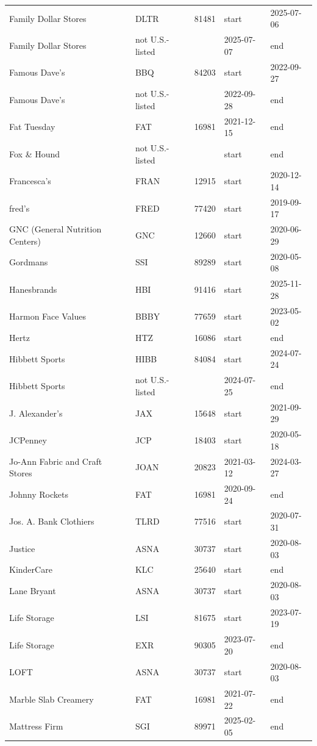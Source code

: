 \begin{longtable}{>{\raggedright\arraybackslash}p{5.2cm}lrll}
Family Dollar Stores & DLTR & 81481 & start & 2025-07-06 \\
Family Dollar Stores & not U.S.-listed &  & 2025-07-07 & end \\
Famous Dave's & BBQ & 84203 & start & 2022-09-27 \\
Famous Dave's & not U.S.-listed &  & 2022-09-28 & end \\
Fat Tuesday & FAT & 16981 & 2021-12-15 & end \\
Fox \& Hound & not U.S.-listed &  & start & end \\
Francesca's & FRAN & 12915 & start & 2020-12-14 \\
fred's & FRED & 77420 & start & 2019-09-17 \\
GNC (General Nutrition Centers) & GNC & 12660 & start & 2020-06-29 \\
Gordmans & SSI & 89289 & start & 2020-05-08 \\
Hanesbrands & HBI & 91416 & start & 2025-11-28 \\
Harmon Face Values & BBBY & 77659 & start & 2023-05-02 \\
Hertz & HTZ & 16086 & start & end \\
Hibbett Sports & HIBB & 84084 & start & 2024-07-24 \\
Hibbett Sports & not U.S.-listed &  & 2024-07-25 & end \\
J. Alexander's & JAX & 15648 & start & 2021-09-29 \\
JCPenney & JCP & 18403 & start & 2020-05-18 \\
Jo-Ann Fabric and Craft Stores & JOAN & 20823 & 2021-03-12 & 2024-03-27 \\
Johnny Rockets & FAT & 16981 & 2020-09-24 & end \\
Jos. A. Bank Clothiers & TLRD & 77516 & start & 2020-07-31 \\
Justice & ASNA & 30737 & start & 2020-08-03 \\
KinderCare & KLC & 25640 & start & end \\
Lane Bryant & ASNA & 30737 & start & 2020-08-03 \\
Life Storage & LSI & 81675 & start & 2023-07-19 \\
Life Storage & EXR & 90305 & 2023-07-20 & end \\
LOFT & ASNA & 30737 & start & 2020-08-03 \\
Marble Slab Creamery & FAT & 16981 & 2021-07-22 & end \\
Mattress Firm & SGI & 89971 & 2025-02-05 & end \\

\end{longtable}
